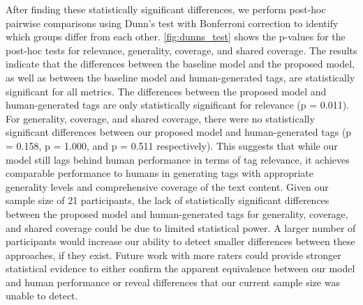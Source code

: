 After finding these statistically significant differences, we perform post-hoc pairwise comparisons using Dunn's test with Bonferroni correction to identify which groups differ from each other. \cref{fig:dunns_test} shows the p-values for the post-hoc tests for relevance, generality, coverage, and shared coverage. The results indicate that the differences between the baseline model and the proposed model, as well as between the baseline model and human-generated tags, are statistically significant for all metrics. The differences between the proposed model and human-generated tags are only statistically significant for relevance (p = 0.011). For generality, coverage, and shared coverage, there were no statistically significant differences between our proposed model and human-generated tags (p = 0.158, p = 1.000, and p = 0.511 respectively). This suggests that while our model still lags behind human performance in terms of tag relevance, it achieves comparable performance to humans in generating tags with appropriate generality levels and comprehensive coverage of the text content. Given our sample size of 21 participants, the lack of statistically significant differences between the proposed model and human-generated tags for generality, coverage, and shared coverage could be due to limited statistical power. A larger number of participants would increase our ability to detect smaller differences between these approaches, if they exist. Future work with more raters could provide stronger statistical evidence to either confirm the apparent equivalence between our model and human performance or reveal differences that our current sample size was unable to detect.

